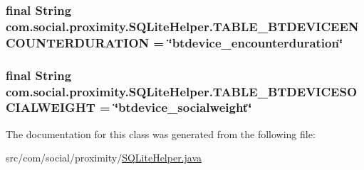 \subsubsection[{T\+A\+B\+L\+E\+\_\+\+B\+T\+D\+E\+V\+I\+C\+E\+E\+N\+C\+O\+U\+N\+T\+E\+R\+D\+U\+R\+A\+T\+I\+O\+N}]{\setlength{\rightskip}{0pt plus 5cm}final String com.\+social.\+proximity.\+S\+Q\+Lite\+Helper.\+T\+A\+B\+L\+E\+\_\+\+B\+T\+D\+E\+V\+I\+C\+E\+E\+N\+C\+O\+U\+N\+T\+E\+R\+D\+U\+R\+A\+T\+I\+O\+N = \char`\"{}btdevice\+\_\+encounterduration\char`\"{}\hspace{0.3cm}{\ttfamily [static]}}\label{classcom_1_1social_1_1proximity_1_1_s_q_lite_helper_a7a34326231133feb3823c4fa9284e729}
\hypertarget{classcom_1_1social_1_1proximity_1_1_s_q_lite_helper_a151e3b34b78b984d2dde9c2ea58d549e}{}
\subsubsection[{T\+A\+B\+L\+E\+\_\+\+B\+T\+D\+E\+V\+I\+C\+E\+S\+O\+C\+I\+A\+L\+W\+E\+I\+G\+H\+T}]{\setlength{\rightskip}{0pt plus 5cm}final String com.\+social.\+proximity.\+S\+Q\+Lite\+Helper.\+T\+A\+B\+L\+E\+\_\+\+B\+T\+D\+E\+V\+I\+C\+E\+S\+O\+C\+I\+A\+L\+W\+E\+I\+G\+H\+T = \char`\"{}btdevice\+\_\+socialweight\char`\"{}\hspace{0.3cm}{\ttfamily [static]}}\label{classcom_1_1social_1_1proximity_1_1_s_q_lite_helper_a151e3b34b78b984d2dde9c2ea58d549e}


The documentation for this class was generated from the following file\+:\begin{DoxyCompactItemize}
\item 
src/com/social/proximity/\hyperlink{_s_q_lite_helper_8java}{S\+Q\+Lite\+Helper.\+java}\end{DoxyCompactItemize}
